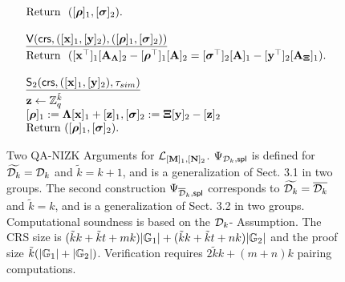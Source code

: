 \begin{figure}
$$\begin{array}{l}
\begin{array}{l}
     \text{Return } \  ([{\boldsymbol \rho}]_1,[{\boldsymbol \sigma}]_2).
    \\
    \\
\end{array}
\\
\begin{array}{l}
    \underline{\mathsf{V}(\mathsf{crs},([\mathbf{x}]_1,[\mathbf{y}]_2), ([{\boldsymbol \rho}]_1,[{\boldsymbol \sigma}]_2))}\\ [.1cm]
    \text{Return } \ ([\mathbf{x}^\top]_1 [\mathbf{{A_\Lambda}}]_2  - [{\boldsymbol \rho^\top}]_1[\mathbf{{A}}]_2=  [{\boldsymbol \sigma^\top}]_2 [\mathbf{{A}}]_1-[\mathbf{y}^\top]_2 [\mathbf{{A_\Xi}}]_1).
    \\
    \\
\end{array}
\\
\begin{array}{l}
    \underline{\mathsf{S}_2(\mathsf{crs},([\mathbf{x}]_1,[\mathbf{y}]_2),\tau_{sim})}\\[.1cm]
    \mathbf{z} \gets \mathbb{Z}_q^{\tilde{k}} \\ 
    {[{\boldsymbol \rho}]_1:=\mathbf{{\Lambda}} [\mathbf{x}]_1+ [\mathbf{z}]_1},{[{\boldsymbol \sigma}]_2:=\mathbf{{\Xi}} [\mathbf{y}]_2- [\mathbf{z}]_2}\\
    {\text{Return }  ([{\boldsymbol \rho}]_1,[{\boldsymbol \sigma}]_2).}
\end{array}
\\
\end{array}
$$
\caption{Two QA-NIZK Arguments for  $\mathcal{L}_{[\mathbf{{M}}]_1,[\mathbf{{N}}]_2}$. $\Psi_{\mathcal{D}_k,\mathsf{spl}}$ is 
 defined for $\widetilde{\mathcal{D}_{k}}=\mathcal{D}_k$ and $\tilde{k}=k+1$, and is a generalization of  
 \cite{EC:KilWee15} Sect. 3.1 in two groups. The second construction $\Psi_{\overline{\mathcal{D}}_k,\mathsf{spl}}$ corresponds to $\widetilde{\mathcal{D}_{k}}=\overline{\mathcal{D}_k}$ and $\tilde{k}=k$, and is a generalization of   \cite{EC:KilWee15} Sect. 3.2 in two groups. Computational soundness is based on the $\mathcal{D}_{k}$-\skermdh{} Assumption. The CRS size is $(\tilde{k}k+\tilde{k}t+mk)|\mathbb{G}_1|+(\tilde{k}k+\tilde{k}t+nk)|\mathbb{G}_2|$ and the proof size $\tilde{k}(|\mathbb{G}_1|+|\mathbb{G}_2|)$. Verification requires $2\tilde{k}k+(m+n)k$ pairing computations. \label{fig:QANIZKtwogroups} }
\end{figure}

